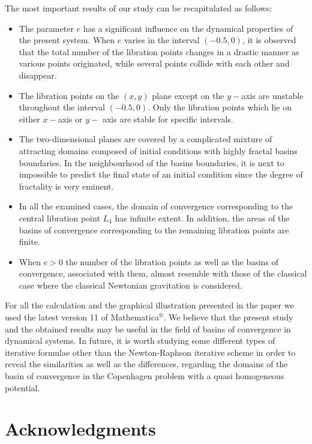 \documentclass[preprint,fleqn,5p,numbers,sort&compress]{elsarticle}
\begin{document}
The most important results of our study can be recapitulated as follows:
\begin{itemize}
  \item The parameter $e$ has a significant influence on the dynamical properties of the present system. When $e$ varies in the interval $(-0.5, 0)$, it is observed that the total number of the libration points changes in a drastic manner as various points originated, while several points collide with each other and disappear.
  \item The libration points on the $(x,y)$ plane except on the $y-$axis are unstable throughout the interval $(-0.5,0)$. Only the libration points which lie on either $x-$axis or $y-$ axis are stable for specific intervals.
  \item The two-dimensional planes are covered by a complicated mixture of attracting domains composed of initial conditions with highly fractal basins boundaries. In the neighbourhood of the basins boundaries, it is next to impossible to predict the final state of an initial condition since the degree of fractality is very eminent.
  \item In all the examined cases, the domain of convergence corresponding to the central libration point $L_4$ has infinite extent. In addition, the areas of the basins of convergence corresponding to the remaining libration points are finite.
  \item When $e > 0$ the number of the libration points as well as the basins of convergence, associated with them, almost resemble with those of the classical case where the classical Newtonian gravitation is considered.
\end{itemize}
For all the calculation and the graphical illustration presented in the paper we used the latest version 11 of Mathematica$^\circledR$. We believe that the present study and the obtained results may be useful in the field of basins of convergence in dynamical systems. In future, it is worth studying some different types of iterative formulae other than the Newton-Raphson iterative scheme in order to reveal the similarities as well as the differences, regarding the domains of the basin of convergence in the Copenhagen problem with a quasi homogeneous potential.

\section*{Acknowledgments}
\footnotesize
\end{document}
